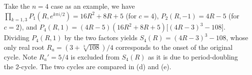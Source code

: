 \documentclass{ws-ijbc}
\begin{document}
Take the $n = 4$ case as an example, we have
$\prod_{k=1,3} P_1(R, e^{k\pi i/2})
=16R^2+8R+5$
(for $c = 4$),
$P_2(R, -1) = 4R - 5$
(for $c = 2$),
and
$P_4(R, 1)
= (4R - 5) (16 R^2 + 8 R + 5)
  \bigl[
    (4R - 3)^3 - 108
  \bigr]$.
Dividing $P_4(R, 1)$ by the two factors yields
$S_4(R) = (4R-3)^3 - 108$,
  whose only real root $R_a=(3+\sqrt[3]{108})/4$ corresponds to
  the onset of the original cycle.
Note $R_a' = 5/4$ is excluded from $S_4(R)$
  as it is due to period-doubling the 2-cycle.
The two cycles are compared in (d) and (e).



%
%
%
%
%
%
%
\end{document}
